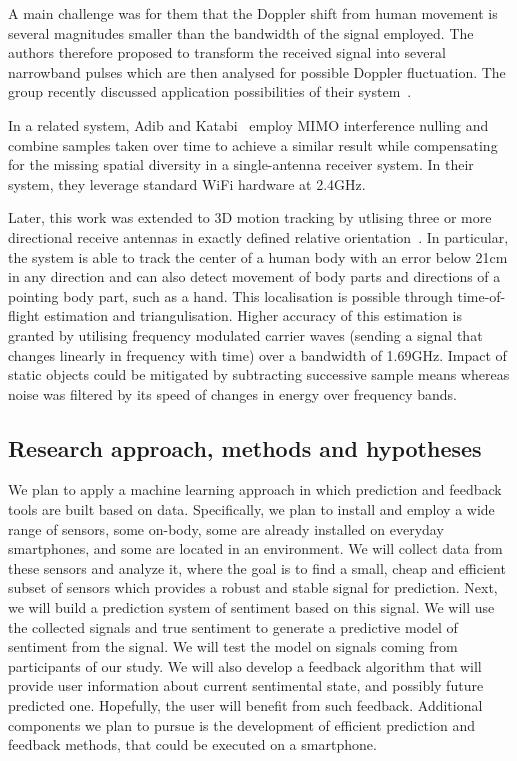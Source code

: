 \documentclass[12pt]{article}
\begin{document}
A main challenge was for them that the Doppler shift from human movement is several magnitudes smaller than the bandwidth of the signal employed.
The authors therefore proposed to transform the received signal into several narrowband pulses which are then analysed for possible Doppler fluctuation.
The group recently discussed application possibilities of their system~\cite{RFSensing_Kellog_2014}.

In a related system, Adib and Katabi~\cite{Pervasive_Adib_2013} employ MIMO interference nulling and combine samples taken over time to achieve a similar result while compensating for the missing spatial diversity in a single-antenna receiver system.
In their system, they leverage standard WiFi hardware at 2.4GHz.

Later, this work was extended to 3D motion tracking by utlising three or more directional receive antennas in exactly defined relative orientation~\cite{RFSensing_Adib_2014}. 
In particular, the system is able to track the center of a human body with an error below 21cm in any direction and can also detect movement of body parts and directions of a pointing body part, such as a hand. 
This localisation is possible through time-of-flight estimation and triangulisation.
Higher accuracy of this estimation is granted by utilising frequency modulated carrier waves (sending a signal that changes linearly in frequency with time) over a bandwidth of 1.69GHz.
Impact of static objects could be mitigated by subtracting successive sample means whereas noise was filtered by its speed of changes in energy over frequency bands. 

\subsection*{Research approach, methods and hypotheses}
We plan to apply a machine learning approach in which prediction and feedback tools are built based on data. Specifically, we plan to install and employ a wide range of sensors, some on-body, some are already installed on everyday smartphones, and some are located in an environment. 
We will collect data from these sensors and analyze it, where the goal is to find a small, cheap and efficient subset of sensors which provides a robust and stable signal for prediction. Next, we will build a prediction system of sentiment based on this signal. We will use the collected signals and true sentiment to generate a predictive model of sentiment from the signal.
We will test the model on signals coming from participants of our study. We will also develop a feedback algorithm that will provide user information about current sentimental state, and possibly future predicted one. Hopefully, the user will benefit from such feedback. Additional components we plan to pursue is the development of efficient prediction and feedback methods, that could be executed on a smartphone.
\end{document}
